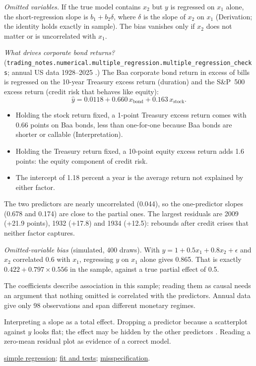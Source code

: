 \begin{qfmethod}
\emph{Omitted variables.} If the true model contains $x_2$ but $y$ is regressed on $x_1$ alone, the short-regression slope is $b_1+b_2\delta$, where $\delta$ is the slope of $x_2$ on $x_1$ (Derivation; the identity holds exactly in sample). The bias vanishes only if $x_2$ does not matter or is uncorrelated with $x_1$.

 \emph{What drives corporate bond returns?} (\nolinkurl{trading_notes.numerical.multiple_regression.multiple_regression_checks}; annual US data 1928--2025 \citep[sheet ``Returns by year'']{us-asset-returns-1928-2025}.) The Baa corporate bond return in excess of bills is regressed on the 10-year Treasury excess return (duration) and the S\&P~500 excess return (credit risk that behaves like equity):
\[ \widehat{y}=0.0118+0.660\,x_{\text{bond}}+0.163\,x_{\text{stock}}. \]
\begin{itemize}
\item Holding the stock return fixed, a 1-point Treasury excess return comes with 0.66 points on Baa bonds, less than one-for-one because Baa bonds are shorter or callable (Interpretation).
\item Holding the Treasury return fixed, a 10-point equity excess return adds 1.6 points: the equity component of credit risk.
\item The intercept of 1.18 percent a year is the average return not explained by either factor.
\end{itemize}
The two predictors are nearly uncorrelated (0.044), so the one-predictor slopes (0.678 and 0.174) are close to the partial ones. The largest residuals are 2009 (+21.9 points), 1932 (+17.8) and 1934 (+12.5): rebounds after credit crises that neither factor captures.

\emph{Omitted-variable bias} (simulated, 400 draws). With $y=1+0.5x_1+0.8x_2+\epsilon$ and $x_2$ correlated 0.6 with $x_1$, regressing $y$ on $x_1$ alone gives 0.865. That is exactly $0.422+0.797\times0.556$ in the sample, against a true partial effect of 0.5.

 The coefficients describe association in this sample; reading them as causal needs an argument that nothing omitted is correlated with the predictors. Annual data give only 98 observations and span different monetary regimes.

 Interpreting a slope as a total effect. Dropping a predictor because a scatterplot against $y$ looks flat; the effect may be hidden by the other predictors \citep[sec.~7.5]{s7-hyndman}. Reading a zero-mean residual plot as evidence of a correct model.

 \hyperref[meth:simple-regression-estimation]{simple regression}; \hyperref[meth:multiple-regression-fit-tests]{fit and tests}; \hyperref[meth:regression-misspecification]{misspecification}.

\end{qfmethod}

